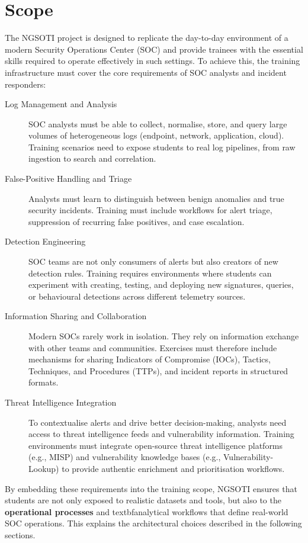 \documentclass[10pt,a4paper]{report}
\begin{document}

\section{Scope}

The NGSOTI project is designed to replicate the day-to-day environment of a modern Security Operations Center (SOC) and provide trainees with the essential skills required to operate effectively in such settings. To achieve this, the training infrastructure must cover the core requirements of SOC analysts and incident responders:

\begin{description}
    \item [Log Management and Analysis] SOC analysts must be able to collect, normalise, store, and query large volumes of heterogeneous logs (endpoint, network, application, cloud). Training scenarios need to expose students to real log pipelines, from raw ingestion to search and correlation.
    \item [ False-Positive Handling and Triage ] Analysts must learn to distinguish between benign anomalies and true security incidents. Training must include workflows for alert triage, suppression of recurring false positives, and case escalation.
    \item [Detection Engineering] SOC teams are not only consumers of alerts but also creators of new detection rules. Training requires environments where students can experiment with creating, testing, and deploying new signatures, queries, or behavioural detections across different telemetry sources.
    \item [Information Sharing and Collaboration] Modern SOCs rarely work in isolation. They rely on information exchange with other teams and communities. Exercises must therefore include mechanisms for sharing Indicators of Compromise (IOCs), Tactics, Techniques, and Procedures (TTPs), and incident reports in structured formats.
    \item [Threat Intelligence Integration] To contextualise alerts and drive better decision-making, analysts need access to threat intelligence feeds and vulnerability information. Training environments must integrate open-source threat intelligence platforms (e.g., MISP) and vulnerability knowledge bases (e.g., Vulnerability-Lookup) to provide authentic enrichment and prioritisation workflows.
\end{description}


By embedding these requirements into the training scope, NGSOTI ensures that students are not only exposed to realistic datasets and tools, but also to the \textbf{operational processes} and textbf{analytical workflows} that define real-world SOC operations. This explains the architectural choices described in the following sections.
\end{document}
